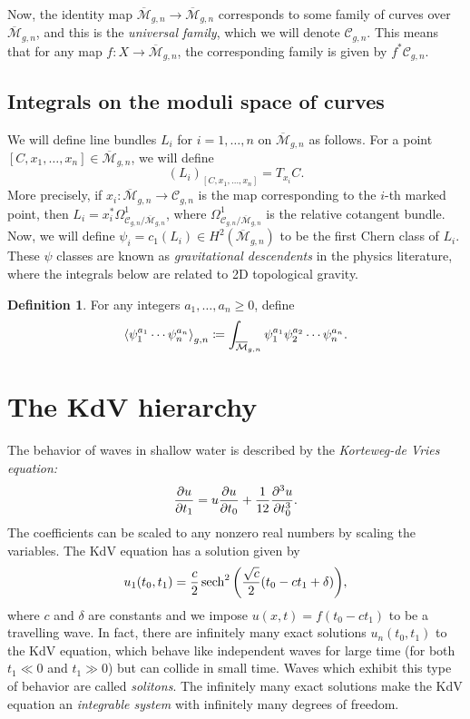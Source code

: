 \documentclass{amsart}
\theoremstyle{definition}
\newtheorem{defn}[thm]{Definition}
\theoremstyle{remark}
\theoremstyle{plain}
\theoremstyle{definition}
\theoremstyle{remark}
\newcommand{\Mbar}{\overline{\mathcal{M}}}
\newcommand{\mc}[1]{\mathcal{#1}}
\newcommand{\1}{\mathbf{1}}
\newcommand{\2}{\mathbf{2}}
\newcommand{\3}{\mathbf{3}}
\begin{document}
Now, the identity map $\Mbar_{g,n} \to \Mbar_{g,n}$ corresponds to some family of curves over $\Mbar_{g,n}$, and this is the \textit{universal family}, which we will denote $\mc{C}_{g,n}$. This means that for any map $f \colon X \to \Mbar_{g,n}$, the corresponding family is given by $f^* \mc{C}_{g,n}$.

\subsection{Integrals on the moduli space of curves}

We will define line bundles $L_i$ for $i=1,\ldots, n$ on $\Mbar_{g,n}$ as follows. For a point $[C, x_1, \ldots, x_n] \in \Mbar_{g,n}$, we will define
\[ (L_i)_{[C,x_1, \ldots, x_n]} = T_{x_i} C. \]
More precisely, if $x_i \colon \Mbar_{g,n} \to \mc{C}_{g,n}$ is the map corresponding to the $i$-th marked point, then $L_i = x_i^* \Omega^1_{\mc{C}_{g,n}/\Mbar_{g,n}}$, where $\Omega^1_{\mc{C}_{g,n}/\Mbar_{g,n}}$ is the relative cotangent bundle. Now, we will define $\psi_i = c_1(L_i) \in H^2(\Mbar_{g,n})$ to be the first Chern class of $L_i$. These $\psi$ classes are known as \textit{gravitational descendents} in the physics literature, where the integrals below are related to 2D topological gravity.

\begin{defn}
    For any integers $a_1, \ldots, a_n \geq 0$, define
    \[ \ev{\psi_1^{a_1} \cdots \psi_n^{a_n}}_{g,n} \coloneqq \int_{\Mbar_{g,n}} \psi_1^{a_1} \psi_2^{a_2} \cdots \psi_n^{a_n}. \]
\end{defn}

\section{The KdV hierarchy}

The behavior of waves in shallow water is described by the \textit{Korteweg-de Vries equation:}
\[ \pdv{u}{t_1} = u \pdv{u}{t_0} + \frac{1}{12} \pdv[3]{u}{t_0}. \]
The coefficients can be scaled to any nonzero real numbers by scaling the variables. The KdV equation has a solution given by
\[ u_1(t_0, t_1) = \frac{c}{2} \sech^2\qty(\frac{\sqrt{c}}{2}(t_0-ct_1+\delta)), \]
where $c$ and $\delta$ are constants and we impose $u(x,t) = f(t_0-ct_1)$ to be a travelling wave. In fact, there are infinitely many exact solutions $u_n(t_0, t_1)$ to the KdV equation, which behave like independent waves for large time (for both $t_1 \ll 0$ and $t_1 \gg 0$) but can collide in small time. Waves which exhibit this type of behavior are called \textit{solitons}. The infinitely many exact solutions make the KdV equation an \textit{integrable system} with infinitely many degrees of freedom.
\end{document}
